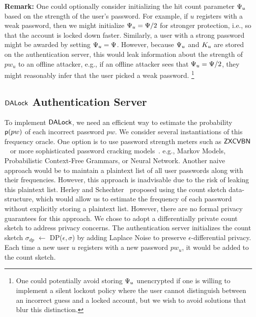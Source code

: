 {\noindent \bf Remark:} One could optionally consider initializing the hit count parameter $\Psi_{u}$ based on the strength of the user's password. For example, if $u$ registers with a weak password, then we might initialize $\Psi_{u} = \Psi/2$ for stronger protection, i.e., so that the account is locked down faster. Similarly, a user with a strong password might be awarded by setting $\Psi_{u} = \Psi$. However, because $\Psi_{u}$ and $K_{u}$ are stored on the authentication server, this would leak information about the strength of $pw_u$ to an offline attacker, e.g., if an offline attacker sees that $\Psi_{u} = \Psi/2$, they might reasonably infer that the user picked a weak password. \footnote{One could potentially avoid storing $\Psi_{u}$ unencrypted if one is willing to implement a silent lockout policy where the user cannot distinguish between an incorrect guess and a locked account, but we wish to avoid solutions that blur this distinction.}  

\vspace*{-\baselineskip}
\subsection{$\mathsf{DALock}$ Authentication Server} %

To implement $\mathsf{DALock}$, we need an efficient way to estimate the probability $\textsf{p}(pw)$ of each incorrect password $pw$. We consider several instantiations of this frequency oracle. One option is to use password strength meters such as $\mathsf{ZXCVBN}$ ~\cite{USENIX:Wheeler16} or more sophisticated password cracking models~\cite{ USENIX:USBCCKKMMS15,USENIX:MUSKBCC16}. e.g., Markov Models, Probabilistic Context-Free Grammars, or Neural Network. Another naive approach would be to maintain a plaintext list of all user passwords along with their frequencies. However, this approach is inadvisable due to the risk of leaking this plaintext list. Herley and Schechter~\cite{HTS:SchHerMit10} proposed using the count sketch data-structure, which would allow us to estimate the frequency of each password without explicitly storing a plaintext list. However, there are no formal privacy guarantees for this approach. We chose to adopt a differentially private count sketch to address privacy concerns. The authentication server initializes the count sketch $\sigma_{dp}$ $\leftarrow$  DP($\epsilon, \sigma$) by adding Laplace Noise to preserve $\epsilon$-differential privacy. Each time a new user $u$ registers with a new password $pw_u$, it would be added to the count sketch.

